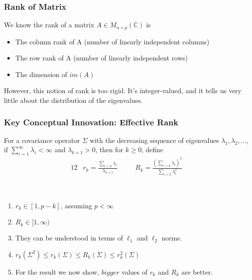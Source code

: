 \documentclass[pdf]{beamer}
\begin{document}
\begin{frame}
\frametitle{Rank of Matrix}

We know the rank of a matrix $A\in M_{n\times p}(\mathbb{C})$ is 

\begin{itemize}
    \item The column rank of A (number of linearly independent columns)
    \item The row rank of A (number of linearly independent rows)
    \item The dimension of $im(A)$
\end{itemize}

However, this notion of rank is too rigid.  It's integer-valued, and it tells us very little about the distribution of the eigenvalues.
\end{frame}



\begin{frame}
\frametitle{Key Conceptual Innovation: Effective Rank}
    \begin{definition}
    For a covariance operator $\Sigma$ with the decreasing sequence of eigenvalues $\lambda_{1},\lambda_{2},...$, if $\sum_{i=1}^{\infty}\lambda_{i} < \infty$ and $\lambda_{k+1} > 0$, then for $k\geq 0$, define \\

    \begin{alignat*}{12}
    & r_{k} = \frac{ \sum_{i > k}\lambda_{i} }{ \lambda_{k+1} } \quad && R_{k} = \frac{ (\sum_{i > k}\lambda_{i})^{2} }{ \sum_{i>k}\lambda_{i}^{2} } 
    \end{alignat*}
    \end{definition} 


\\
\begin{enumerate}
\item<3-7> $r_{k} \in [1, p - k]$, assuming $p < \infty$
\item<4-7> $R_{k} \in [1, \infty)$
\item<5-7> They can be understood in terms of $\ell_{1}$ and $\ell_{2}$ norms.
\item<6-7> $r_{k}(\Sigma^{2}) \leq r_{k}(\Sigma) \leq R_{k}(\Sigma) \leq r^{2}_{k}(\Sigma) $
\item<7-7> For the result we now show, $\textit{bigger}$ values of $r_{k}$ and $R_{k}$ are better.
\end{enumerate}

\end{frame}
\end{document}
